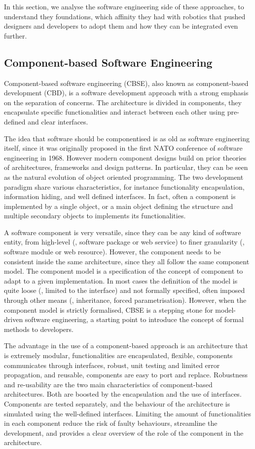In this section, we analyse the software engineering side of these approaches, to understand they foundations, which affinity they had with robotics that pushed designers and developers to adopt them and how they can be integrated even further.

\subsection{Component-based Software Engineering}
Component-based software engineering (CBSE), also known as component-based development (CBD), is a software development approach with  a strong emphasis on the separation of concerns. The architecture is divided in components, they encapsulate specific functionalities and interact between each other using pre-defined and clear interfaces.

The idea that software should be componentised is as old as software engineering itself, since it was originally proposed in the first NATO conference of software engineering in 1968. However modern component designs build on prior theories of architectures, frameworks and design patterns. In particular, they can be seen as the natural evolution of object oriented programming. The two development paradigm share various characteristics, for instance functionality encapsulation, information hiding, and well defined interfaces. In fact, often a component is implemented by a single object, or a main object defining the structure and multiple secondary objects to implements its functionalities.

A software component is very versatile, since they can be any kind of software entity, from high-level (\eg, software package or web service) to finer granularity (\eg, software module or web resource). However, the component needs to be consistent inside the same architecture, since they all follow the same component model. The component model is a specification of the concept of component to adapt to a given implementation. In most cases the definition of the model is quite loose (\eg, limited to the interface) and not formally specified, often imposed through other means (\eg, inheritance, forced parametrisation). However, when the component model is strictly formalised, CBSE is a stepping stone for model-driven software engineering, a starting point to introduce the concept of formal methods to developers.

The advantage in the use of a component-based approach is an architecture that is extremely modular, functionalities are encapsulated, flexible, components communicates through interfaces, robust, unit testing and limited error propagation, and reusable, components are easy to port and replace. Robustness and re-usability are the two main characteristics of component-based architectures. Both are boosted by the encapsulation and the use of interfaces. Components are tested separately, and the behaviour of the architecture is simulated using the well-defined interfaces. Limiting the amount of functionalities in each component reduce the risk of faulty behaviours, streamline the development, and provides a clear overview of the role of the component in the architecture.

